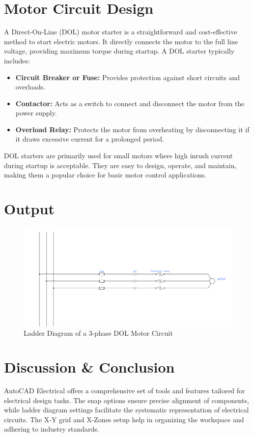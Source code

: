 \documentclass[12pt]{article}
\begin{document}
\section*{Motor Circuit Design}
A Direct-On-Line (DOL) motor starter is a straightforward and cost-effective method to start electric motors. It directly connects the motor to the full line voltage, providing maximum torque during startup. A DOL starter typically includes:

\begin{itemize}
    \item \textbf{Circuit Breaker or Fuse:} Provides protection against short circuits and overloads.
    \item \textbf{Contactor:} Acts as a switch to connect and disconnect the motor from the power supply.
    \item \textbf{Overload Relay:} Protects the motor from overheating by disconnecting it if it draws excessive current for a prolonged period.
\end{itemize}

DOL starters are primarily used for small motors where high inrush current during startup is acceptable. They are easy to design, operate, and maintain, making them a popular choice for basic motor control applications.

\section*{Output}
\begin{figure}[H]
    \centering
    \includegraphics[width=.9\textwidth]{DOL.png}
    \caption{Ladder Diagram of a 3-phase DOL Motor Circuit}
    \label{fig:motor_circuit}
\end{figure}

\section*{Discussion \& Conclusion}
AutoCAD Electrical offers a comprehensive set of tools and features tailored for electrical design tasks. The snap options ensure precise alignment of components, while ladder diagram settings facilitate the systematic representation of electrical circuits. The X-Y grid and X-Zones setup help in organizing the workspace and adhering to industry standards.\\\\

% 
% 
\end{document}
